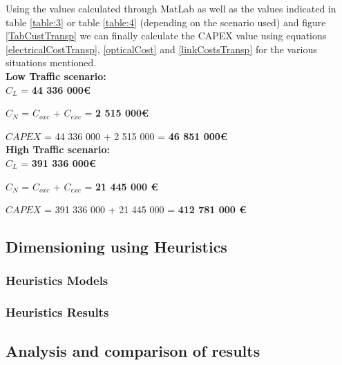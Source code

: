 Using the values calculated through MatLab as well as the values indicated in table \ref{table:3} or table \ref{table:4} (depending on the scenario used) and figure \ref{TabCustTransp} we can finally calculate the CAPEX value using equations \ref{electricalCostTransp}, \ref{opticalCost} and \ref{linkCostsTransp} for the various situations mentioned.\\


\textbf{Low Traffic scenario:}\\

$C_L$ = \textbf{44 336 000\euro}

$C_N$ = $C_{oxc}$ + $C_{exc}$ = \textbf{2 515 000\euro}

$CAPEX$ = 44 336 000 + 2 515 000 = \textbf{46 851 000\euro}\\

\textbf{High Traffic scenario:}\\

$C_L$ = \textbf{391 336 000\euro}

$C_N$ = $C_{oxc}$ + $C_{exc}$ = \textbf{21 445 000 \euro}

$CAPEX$ = 391 336 000 + 21 445 000 = \textbf{412 781 000 \euro}\\


\subsection{Dimensioning using Heuristics}

\subsubsection{Heuristics Models}

\subsubsection{Heuristics Results}

\subsection{Analysis and comparison of results}
